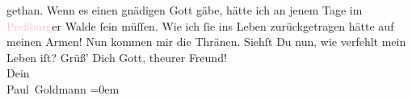               gethan.\pend
           \pstart
           Wenn es einen gnädigen Gott gäbe, hätte ich an jenem Tage im \textcolor{pink}{Preßburg}{}\ledrightnote{\textcolor{pink}{Bratislava}}er Walde ſein müſſen. Wie ich ſie ins Leben
               zurückgetragen hätte auf meinen Armen!\pend
           \pstart
           Nun kommen mir die Thränen.\pend
           \pstart
           Siehſt Du nun, wie verfehlt mein Leben iſt?\pend
           \pstart
           Grüß’ Dich Gott, theurer Freund!{\\[\baselineskip]}Dein{\\[\baselineskip]}\spacefill\mbox{Paul Goldmann}\pend
           \leftskip=0em{}\endnumbering{}  
      